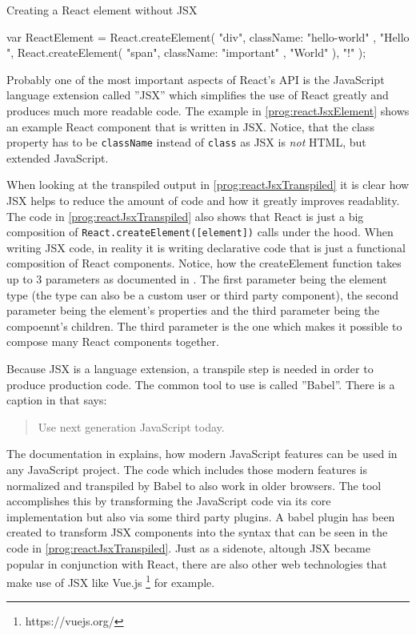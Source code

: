 \begin{program}
\caption{Creating a React element without JSX} 
\label{prog:reactJsxTranspiled}
\begin{JsCode}
var ReactElement = React.createElement(
  "div", 
  { className: "hello-world" }, 
  "Hello ", 
  React.createElement(
    "span", 
    { className: "important" }, 
    "World"
  ), 
  "!"
);
\end{JsCode}
\end{program}

Probably one of the most important aspects of React's API is the JavaScript language extension called ''JSX'' which simplifies the use of React greatly and produces much more readable code. The example in \ref{prog:reactJsxElement} shows an example React component that is written in JSX. Notice, that the class property has to be \texttt{className} instead of \texttt{class} as JSX is \emph{not} HTML, but extended JavaScript.

When looking at the transpiled output in \ref{prog:reactJsxTranspiled} it is clear how JSX helps to reduce the amount of code and how it greatly improves readablity. The code in \ref{prog:reactJsxTranspiled} also shows that React is just a big composition of \texttt{React.createElement([element])} calls under the hood. When writing JSX code, in reality it is writing declarative code that is just a functional composition of React components. Notice, how the createElement function takes up to 3 parameters as documented in \cite[/docs/react-api.html]{React}. The first parameter being the element type (the type can also be a custom user or third party component), the second parameter being the element's properties and the third parameter being the compoennt's children. The third parameter is the one which makes it possible to compose many React components together.

Because JSX is a language extension, a transpile step is needed in order to produce production code. The common tool to use is called ''Babel''. There is a caption in \cite{Babel} that says: \begin{quote}\begin{english}Use next generation JavaScript today.\end{english}\end{quote} The documentation in \cite[/docs/en]{Babel} explains, how modern JavaScript features can be used in any JavaScript project. The code which includes those modern features is normalized and transpiled by Babel to also work in older browsers. The tool accomplishes this by transforming the JavaScript code via its core implementation but also via some third party plugins. A babel plugin has been created to transform JSX components into the syntax that can be seen in the code in \ref{prog:reactJsxTranspiled}. Just as a sidenote, altough JSX became popular in conjunction with React, there are also other web technologies that make use of JSX like Vue.js \footnote{https://vuejs.org/} for example.

